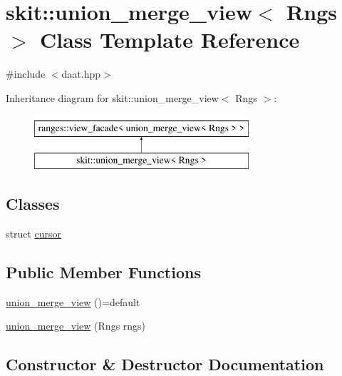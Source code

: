 \hypertarget{classskit_1_1union__merge__view}{}\section{skit\+:\+:union\+\_\+merge\+\_\+view$<$ Rngs $>$ Class Template Reference}
\label{classskit_1_1union__merge__view}


{\ttfamily \#include $<$daat.\+hpp$>$}

Inheritance diagram for skit\+:\+:union\+\_\+merge\+\_\+view$<$ Rngs $>$\+:\begin{figure}[H]
\begin{center}
\leavevmode
\includegraphics[height=2.000000cm]{classskit_1_1union__merge__view}
\end{center}
\end{figure}
\subsection*{Classes}
\begin{DoxyCompactItemize}
\item 
struct \hyperlink{structskit_1_1union__merge__view_1_1cursor}{cursor}
\end{DoxyCompactItemize}
\subsection*{Public Member Functions}
\begin{DoxyCompactItemize}
\item 
\hyperlink{classskit_1_1union__merge__view_a0329fd5523d55a17965c0bbd7fc511ed}{union\+\_\+merge\+\_\+view} ()=default
\item 
\hyperlink{classskit_1_1union__merge__view_a8acb6284ab30d1366e782f363ebdba87}{union\+\_\+merge\+\_\+view} (Rngs rngs)
\end{DoxyCompactItemize}


\subsection{Constructor \& Destructor Documentation}
\mbox{\label{classskit_1_1union__merge__view_a0329fd5523d55a17965c0bbd7fc511ed}} 
